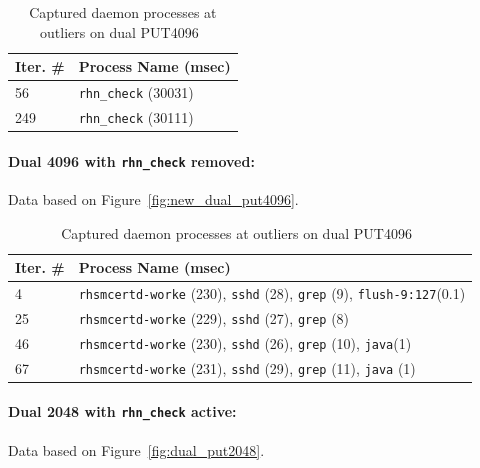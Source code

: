\documentclass[10pt]{article}
\begin{document}
\begin{table}[htp!]
\centering
{
 \begin{tabular}{|p{2cm}|p{8cm}|} \hline
Iter. \# & Process Name (msec)\\ \hline
56 & {\tt rhn\_check} (30031) \\ \hline
249 & {\tt rhn\_check} (30111) \\ \hline
  \end{tabular}
  }
 \caption{Captured daemon processes at outliers on dual PUT4096~\label{fig:dual_put4096_procs}}
\end{table}

\paragraph{Dual 4096 with {\tt rhn\_check} removed:} Data based on Figure~\ref{fig:new_dual_put4096}.

\begin{table}[htp!]
\centering
{
 \begin{tabular}{|p{2cm}|p{8cm}|} \hline
Iter. \# & Process Name (msec)\\ \hline
4 & {\tt rhsmcertd-worke} (230), {\tt sshd} (28), {\tt grep} (9), {\tt flush-9:127}(0.1)\\ \hline
25 & {\tt rhsmcertd-worke} (229), {\tt sshd} (27), {\tt grep} (8)\\ \hline
46 & {\tt rhsmcertd-worke} (230), {\tt sshd} (26), {\tt grep} (10), {\tt java}(1) \\ \hline
67 & {\tt rhsmcertd-worke} (231), {\tt sshd} (29), {\tt grep} (11),  {\tt java} (1) \\ \hline
  \end{tabular}
  }
 \caption{Captured daemon processes at outliers on dual PUT4096~\label{fig:no_rhn_dual_put4096_procs}}
\end{table}

\paragraph{Dual 2048 with {\tt rhn\_check} active:} Data based on Figure~\ref{fig:dual_put2048}.
\end{document}
